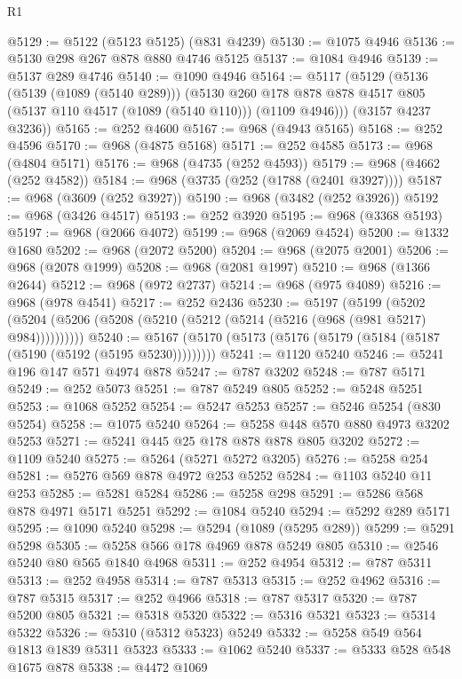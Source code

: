 \begin{lexlean}{R1}
\begin{coremodule}
@5129 := @5122 (@5123 @5125) (@831 @4239)
@5130 := @1075 @4946
@5136 := @5130 @298 @267 @878 @880 @4746 @5125
@5137 := @1084 @4946
@5139 := @5137 @289 @4746
@5140 := @1090 @4946
@5164 := @5117
    (@5129
      (@5136
        (@5139 (@1089 (@5140 @289)))
        (@5130
          @260
          @178
          @878
          @878
          @4517
          @805
          (@5137 @110 @4517 (@1089 (@5140 @110)))
          (@1109 @4946)))
      (@3157 @4237 @3236))
@5165 := @252 @4600
@5167 := @968 (@4943 @5165)
@5168 := @252 @4596
@5170 := @968 (@4875 @5168)
@5171 := @252 @4585
@5173 := @968 (@4804 @5171)
@5176 := @968 (@4735 (@252 @4593))
@5179 := @968 (@4662 (@252 @4582))
@5184 := @968 (@3735 (@252 (@1788 (@2401 @3927))))
@5187 := @968 (@3609 (@252 @3927))
@5190 := @968 (@3482 (@252 @3926))
@5192 := @968 (@3426 @4517)
@5193 := @252 @3920
@5195 := @968 (@3368 @5193)
@5197 := @968 (@2066 @4072)
@5199 := @968 (@2069 @4524)
@5200 := @1332 @1680
@5202 := @968 (@2072 @5200)
@5204 := @968 (@2075 @2001)
@5206 := @968 (@2078 @1999)
@5208 := @968 (@2081 @1997)
@5210 := @968 (@1366 @2644)
@5212 := @968 (@972 @2737)
@5214 := @968 (@975 @4089)
@5216 := @968 (@978 @4541)
@5217 := @252 @2436
@5230 := @5197
    (@5199 (@5202 (@5204 (@5206 (@5208 (@5210 (@5212 (@5214 (@5216 (@968 (@981 @5217) @984))))))))))
@5240 := @5167 (@5170 (@5173 (@5176 (@5179 (@5184 (@5187 (@5190 (@5192 (@5195 @5230)))))))))
@5241 := @1120 @5240
@5246 := @5241 @196 @147 @571 @4974 @878
@5247 := @787 @3202
@5248 := @787 @5171
@5249 := @252 @5073
@5251 := @787 @5249 @805
@5252 := @5248 @5251
@5253 := @1068 @5252
@5254 := @5247 @5253
@5257 := @5246 @5254 (@830 @5254)
@5258 := @1075 @5240
@5264 := @5258 @448 @570 @880 @4973 @3202 @5253
@5271 := @5241 @445 @25 @178 @878 @878 @805 @3202
@5272 := @1109 @5240
@5275 := @5264 (@5271 @5272 @3205)
@5276 := @5258 @254
@5281 := @5276 @569 @878 @4972 @253 @5252
@5284 := @1103 @5240 @11 @253
@5285 := @5281 @5284
@5286 := @5258 @298
@5291 := @5286 @568 @878 @4971 @5171 @5251
@5292 := @1084 @5240
@5294 := @5292 @289 @5171
@5295 := @1090 @5240
@5298 := @5294 (@1089 (@5295 @289))
@5299 := @5291 @5298
@5305 := @5258 @566 @178 @4969 @878 @5249 @805
@5310 := @2546 @5240 @80 @565 @1840 @4968
@5311 := @252 @4954
@5312 := @787 @5311
@5313 := @252 @4958
@5314 := @787 @5313
@5315 := @252 @4962
@5316 := @787 @5315
@5317 := @252 @4966
@5318 := @787 @5317
@5320 := @787 @5200 @805
@5321 := @5318 @5320
@5322 := @5316 @5321
@5323 := @5314 @5322
@5326 := @5310 (@5312 @5323) @5249
@5332 := @5258 @549 @564 @1813 @1839 @5311 @5323
@5333 := @1062 @5240
@5337 := @5333 @528 @548 @1675 @878
@5338 := @4472 @1069

\end{coremodule}
\end{lexlean}
